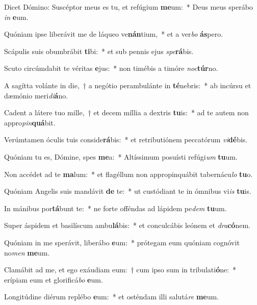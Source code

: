 \item Dicet Dómino: Suscéptor meus es tu, et refúgium \textbf{me}um:~* Deus meus sperábo \textit{in} \textbf{e}um.
\item Quóniam ipse liberávit me de láqueo ve\textbf{nán}tium,~* et a ver\textit{bo} \textbf{ás}pero.
\item Scápulis suis obumbrábit \textbf{ti}bi:~* et sub pennis ejus \textit{spe}\textbf{rá}bis.
\item Scuto circúmdabit te véritas \textbf{e}jus:~* non timébis a timóre \textit{noc}\textbf{túr}no.
\item A sagítta volánte in die,~† a negótio perambulánte in \textbf{té}nebris:~* ab incúrsu et dæmónio meri\textit{di}\textbf{á}no.
\item Cadent a látere tuo mille,~† et decem míllia a dextris \textbf{tu}is:~* ad te autem non appro\textit{pin}\textbf{quá}bit.
\item Verúmtamen óculis tuis conside\textbf{rá}bis:~* et retributiónem peccatórum \textit{vi}\textbf{dé}bis.
\item Quóniam tu es, Dómine, spes \textbf{me}a:~* Altíssimum posuísti refúgi\textit{um} \textbf{tu}um.
\item Non accédet ad te \textbf{ma}lum:~* et flagéllum non appropinquábit tabernácu\textit{lo} \textbf{tu}o.
\item Quóniam Angelis suis mandávit \textbf{de} te:~* ut custódiant te in ómnibus vi\textit{is} \textbf{tu}is.
\item In mánibus por\textbf{tá}bunt te:~* ne forte offéndas ad lápidem pe\textit{dem} \textbf{tu}um.
\item Super áspidem et basilíscum ambu\textbf{lá}bis:~* et conculcábis leónem et \textit{dra}\textbf{có}nem.
\item Quóniam in me sperávit, liberábo \textbf{e}um:~* prótegam eum quóniam cognóvit no\textit{men} \textbf{me}um.
\item Clamábit ad me, et ego exáudiam eum:~† cum ipso sum in tribulati\textbf{ó}ne:~* erípiam eum et glorificá\textit{bo} \textbf{e}um.
\item Longitúdine diérum replébo \textbf{e}um:~* et osténdam illi salutá\textit{re} \textbf{me}um.
